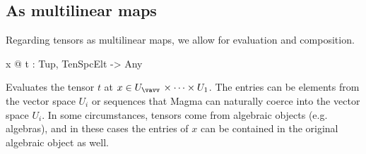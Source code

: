 \subsection{As multilinear maps}
Regarding tensors as multilinear maps, we allow for evaluation and composition.

\begin{intrinsics}
x @ t : Tup, TenSpcElt -> Any
\end{intrinsics}

Evaluates the tensor $t$ at $x\in U_{\vav}\times \cdots \times U_1$.
The entries can be elements from the vector space $U_i$ or sequences that Magma can naturally coerce into the vector space $U_i$.
In some circumstances, tensors come from algebraic objects (e.g.\! algebras), and in these cases the entries of $x$ can be contained in the original algebraic object as well. 

